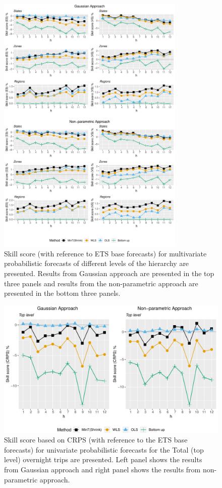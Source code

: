 \documentclass[12pt]{article}
\theoremstyle{definition}
\begin{document}
\begin{figure}[!hbt]
	\centering
	\small
	\includegraphics[width= 0.8\textwidth, height= 0.85\textheight]{Empirical-results/Levels_MultiVScores_ETS.pdf}
	\caption{Skill score (with reference to ETS base forecasts) for multivariate probabilistic forecasts of different levels of the hierarchy are presented. Results from Gaussian approach are presented in the top three panels and results from the non-parametric approach are presented in the bottom three panels.}\label{fig:EmpResults_Levels_ETS}
\end{figure}

\begin{figure}[!hbt]
	\centering
	\small
	\includegraphics[width= \textwidth]{Empirical-results/UniVScore_TopLevel_ETS.pdf}
	\caption{Skill score based on CRPS (with reference to the ETS base forecasts) for univariate probabilistic forecasts for the Total (top level) overnight trips are presented. Left panel shows the results from Gaussian approach and right panel shows the results from non-parametric approach. }\label{fig:EmpResults_TopLevel_ETS}
\end{figure}
\end{document}

